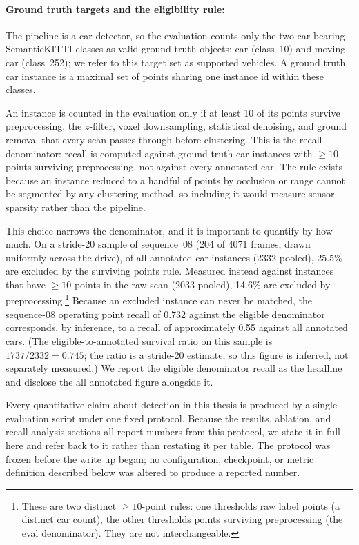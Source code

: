 \documentclass[a4paper,12pt]{report}
\begin{document}
\paragraph{Ground truth targets and the eligibility rule:}
\label{sec:eval-targets}

The pipeline is a car detector, so the evaluation counts only the two
car-bearing SemanticKITTI classes as valid ground truth objects:
car (class~10) and moving car (class~252); we refer to this target
set as supported vehicles. A ground truth car instance is a
maximal set of points sharing one instance id within these classes.

An instance is counted in the evaluation only if at least 10 of its
points survive preprocessing, the $z$-filter, voxel downsampling, statistical
denoising, and ground removal that every scan passes through before clustering.
This is the recall denominator: recall is computed against ground truth car
instances with $\geq 10$ points surviving preprocessing, not against every
annotated car. The rule exists because an instance reduced to a handful of points
by occlusion or range cannot be segmented by any clustering method, so including
it would measure sensor sparsity rather than the pipeline.

This choice narrows the denominator, and it is important to quantify by how
much. On a stride-20 sample of sequence~08 (204 of \num{4071} frames, drawn
uniformly across the drive), of all annotated car instances
(\num{2332} pooled), 25.5\% are excluded by the surviving points rule.
Measured instead against instances that have $\geq 10$ points in the raw
scan (\num{2033} pooled), 14.6\% are excluded by preprocessing.\footnote{%
These are two distinct $\geq 10$-point rules: one thresholds raw label
points (a distinct car count), the other thresholds points surviving
preprocessing (the eval denominator). They are not interchangeable.}
Because an excluded instance can never be matched, the sequence-08 operating point
recall of \num{0.732} against the eligible denominator corresponds, by inference, to a
recall of approximately \num{0.55} against all annotated cars. (The eligible-to-annotated
survival ratio on this sample is $\num{1737}/\num{2332}=\num{0.745}$; the ratio is a
stride-20 estimate, so this figure is inferred, not separately measured.) We report the eligible denominator
recall as the headline and disclose the all annotated figure alongside it.

\label{sec:eval-protocol}

Every quantitative claim about detection in this thesis is produced by a single
evaluation script under one fixed protocol. Because
the results, ablation, and recall analysis sections all report numbers from this
protocol, we state it in full here and refer back to it rather than restating it
per table. The protocol was frozen before the write up began; no configuration,
checkpoint, or metric definition described below was altered to produce a
reported number.
\end{document}
